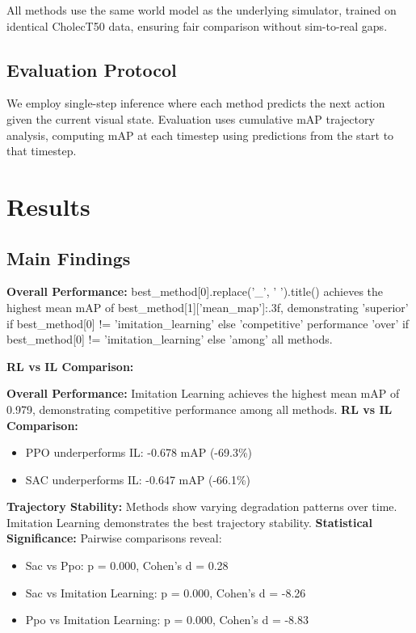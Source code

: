 \documentclass[conference]{IEEEtran}
\begin{document}
All methods use the same world model as the underlying simulator, trained on identical CholecT50 data, ensuring fair comparison without sim-to-real gaps.

\subsection{Evaluation Protocol}
We employ single-step inference where each method predicts the next action given the current visual state. Evaluation uses cumulative mAP trajectory analysis, computing mAP at each timestep using predictions from the start to that timestep.

\section{Results}



\subsection{Main Findings}

\textbf{Overall Performance:} {best_method[0].replace('_', ' ').title()} achieves the highest mean mAP of {best_method[1]['mean_map']:.3f}, demonstrating {'superior' if best_method[0] != 'imitation_learning' else 'competitive'} performance {'over' if best_method[0] != 'imitation_learning' else 'among'} all methods.

\textbf{RL vs IL Comparison:}

\textbf{Overall Performance:} Imitation Learning achieves the highest mean mAP of 0.979, demonstrating competitive performance among all methods.
\textbf{RL vs IL Comparison:}
\begin{itemize}
\item PPO underperforms IL: -0.678 mAP (-69.3\%)
\item SAC underperforms IL: -0.647 mAP (-66.1\%)
\end{itemize}

\textbf{Trajectory Stability:} Methods show varying degradation patterns over time. Imitation Learning demonstrates the best trajectory stability.
\textbf{Statistical Significance:} Pairwise comparisons reveal:
\begin{itemize}
\item Sac vs Ppo: p = 0.000, Cohen's d = 0.28
\item Sac vs Imitation Learning: p = 0.000, Cohen's d = -8.26
\item Ppo vs Imitation Learning: p = 0.000, Cohen's d = -8.83
\end{itemize}
\end{document}
